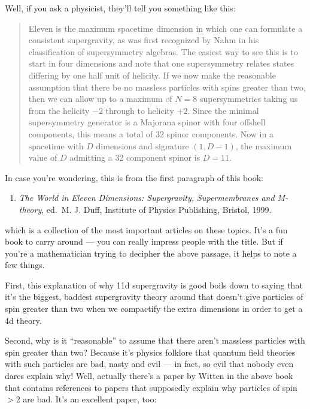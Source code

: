 \documentclass{article}
\def\tightlist{}
\begin{document}
Well, if you ask a physicist, they'll tell you something like this:

\begin{quote}
Eleven is the maximum spacetime dimension in which one can formulate a
consistent supergravity, as was first recognized by Nahm in his
classification of supersymmetry algebras. The easiest way to see this is
to start in four dimensions and note that one supersymmetry relates
states differing by one half unit of helicity. If we now make the
reasonable assumption that there be no massless particles with spins
greater than two, then we can allow up to a maximum of \(N = 8\)
supersymmetries taking us from the helicity \(-2\) through to helicity
\(+2\). Since the minimal supersymmetry generator is a Majorana spinor
with four offshell components, this means a total of 32 spinor
components. Now in a spacetime with \(D\) dimensions and signature
\((1,D-1)\), the maximum value of \(D\) admitting a 32 component spinor
is \(D = 11\).
\end{quote}

In case you're wondering, this is from the first paragraph of this book:

\begin{enumerate}
\def\labelenumi{\arabic{enumi})}
\tightlist
\item
  \emph{The World in Eleven Dimensions: Supergravity, Supermembranes and
  M-theory}, ed.~M. J. Duff, Institute of Physics Publishing, Bristol,
  1999.
\end{enumerate}

which is a collection of the most important articles on these topics.
It's a fun book to carry around --- you can really impress people with
the title. But if you're a mathematician trying to decipher the above
passage, it helps to note a few things.

First, this explanation of why 11d supergravity is good boils down to
saying that it's the biggest, baddest supergravity theory around that
doesn't give particles of spin greater than two when we compactify the
extra dimensions in order to get a 4d theory.

Second, why is it ``reasonable'' to assume that there aren't massless
particles with spin greater than two? Because it's physics folklore that
quantum field theories with such particles are bad, nasty and evil ---
in fact, so evil that nobody even dares explain why! Well, actually
there's a paper by Witten in the above book that contains references to
papers that supposedly explain why particles of spin \(> 2\) are bad.
It's an excellent paper, too:
\end{document}
